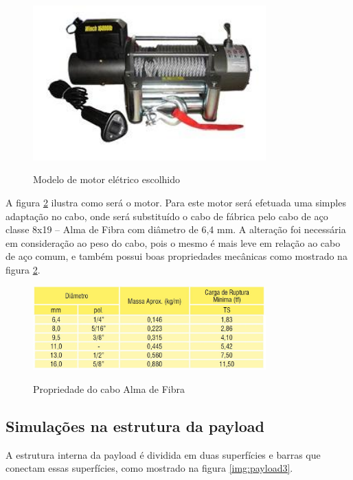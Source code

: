 \begin{figure}[htp]
	\centering
	\caption[Modelo de motor elétrico escolhido]{Modelo de motor elétrico escolhido~\cite{bremem}}
	\includegraphics[width=0.8\textwidth]{figuras/modelodemotoreletrico}
	\label{img:motorescolhido}
\end{figure}

A figura \ref{img:motorescolhido} ilustra como será o motor. Para este motor será efetuada uma simples adaptação no cabo, onde será substituído o cabo de fábrica pelo cabo de aço classe 8x19 – Alma de Fibra com diâmetro de 6,4 mm. A alteração foi necessária em consideração ao peso do cabo, pois o mesmo é mais leve em relação ao cabo de aço comum, e também possui boas propriedades mecânicas como mostrado na figura \ref{img:motorescolhido}.

\begin{figure}[htp]
	\centering
	\caption[Propriedade do cabo Alma de Fibra]{Propriedade do cabo Alma de Fibra~\cite{acrocabo}}
	\includegraphics[width=0.8\textwidth]{figuras/tabelacabo}
	\label{img:motorescolhido}
\end{figure}

\subsection{Simulações na estrutura da payload}

	A estrutura interna da payload é dividida em duas superfícies e barras que conectam essas superfícies, como mostrado na figura \ref{img:payload3}.

